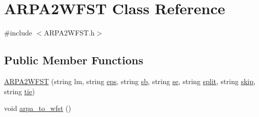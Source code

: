 \hypertarget{class_a_r_p_a2_w_f_s_t}{}\section{A\+R\+P\+A2\+W\+F\+ST Class Reference}
\label{class_a_r_p_a2_w_f_s_t}


{\ttfamily \#include $<$A\+R\+P\+A2\+W\+F\+S\+T.\+h$>$}

\subsection*{Public Member Functions}
\begin{DoxyCompactItemize}
\item 
\hyperlink{class_a_r_p_a2_w_f_s_t_ab4bd900786807977ced8d8a77c218351}{A\+R\+P\+A2\+W\+F\+ST} (string lm, string \hyperlink{class_a_r_p_a2_w_f_s_t_ac3c171a25b4f9cee7a2977301af868ce}{eps}, string \hyperlink{class_a_r_p_a2_w_f_s_t_a98d68ef7089bf028a9ec5ce8929a7e9a}{sb}, string \hyperlink{class_a_r_p_a2_w_f_s_t_aaca67dc9e7b65acfb8aa24b542db8fe4}{se}, string \hyperlink{class_a_r_p_a2_w_f_s_t_aa9a5047c54dbfe3ffd799a28eb809729}{split}, string \hyperlink{class_a_r_p_a2_w_f_s_t_a5574ec74f50b2b78490e608ea10ef046}{skip}, string \hyperlink{class_a_r_p_a2_w_f_s_t_ab2db4a57e9b4020e3c9efda458d1355e}{tie})
\item 
void \hyperlink{class_a_r_p_a2_w_f_s_t_a5375a63a5b60605e7de0057cbeb10a50}{arpa\+\_\+to\+\_\+wfst} ()
\end{DoxyCompactItemize}

